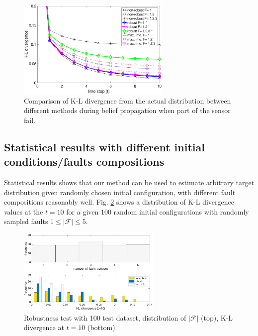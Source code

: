\documentclass[letterpaper, 10 pt, conference]{ieeeconf}
\begin{document}
\begin{figure}
	\centering
	\includegraphics[width=2.9in]{figure/cost_comp000}
	\caption{Comparison of K-L divergence from the actual distribution between different methods during belief propagation when part of the sensor fail.}
	\label{fig:fig7}
\end{figure}


\subsection{Statistical results with different initial conditions/faults compositions}
Statistical results shows that our method can be used to estimate arbitrary target distribution given randomly chosen initial configuration, with different fault compositions reasonably well. 
Fig. \ref{fig:fig8} shows a distribution of K-L divergence values at the $t=10$ for a given $100$ random initial configurations with randomly sampled faults $1\leq \left|\mathcal{F}\right| \leq 5$.
\begin{figure}
	\centering
	\includegraphics[width=2.7in]{figure/stat_result}
	\caption{Robustness test with 100 test dataset, distribution of $\left|\mathcal{F}\right|$ (top), K-L divergence at $t=10$ (bottom).} 
	\label{fig:fig8}
\end{figure}

\end{document}

